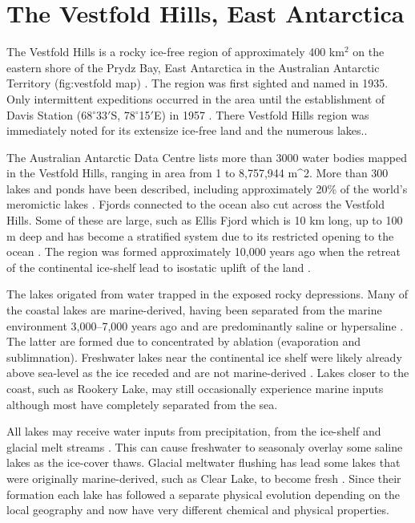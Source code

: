 
\section{The Vestfold Hills, East Antarctica}
The Vestfold Hills is a rocky ice-free region of approximately 400 km$^2$ on the eastern shore of the Prydz Bay, East Antarctica in the Australian Antarctic Territory (fig:vestfold map) \cite{Gibson1999}.
The region was first sighted and named in 1935\cite{Law1959}.
Only intermittent expeditions occurred in the area until the establishment of Davis Station (68$^{\circ}$33$'$S, 78$^{\circ}$15$'$E) in 1957 \cite {Law1959}. 
There Vestfold Hills region was immediately noted for its extensize ice-free land and the numerous lakes.\cite{Johnstone1973}.

The Australian Antarctic Data Centre lists more than 3000 water bodies mapped in the Vestfold Hills, ranging in area from 1 to 8,757,944 m\^{}2.%
More than 300 lakes and ponds have been described, including approximately 20\% of the world's meromictic lakes \cite{Gibson, 1999}. %
Fjords connected to the ocean also cut across the Vestfold Hills. 
Some of these are large, such as Ellis Fjord which is 10 km long, up to 100 m deep and has become a stratified system due to its restricted opening to the ocean \cite{Burke1988}.
The region was formed approximately 10,000 years ago when the retreat of the continental ice-shelf lead to isostatic uplift of the land \cite{Burton1981}. 

The lakes origated from water trapped in the exposed rocky depressions.
Many of the coastal lakes are marine-derived, having been separated from the marine environment 3,000--7,000 years ago \cite{Gibson1999} and are predominantly saline or hypersaline \cite{Burke1988}.
The latter are formed due to concentrated by ablation (evaporation and sublimnation). %
Freshwater lakes near the continental ice shelf were likely already above sea-level as the ice receded and are not marine-derived \cite{Laybourne-Parry1992} \cite{Bronge1996}.
Lakes closer to the coast, such as Rookery Lake, may still occasionally experience marine inputs although most have completely separated from the sea. %

All lakes may receive water inputs from precipitation, from the ice-shelf and glacial melt streams \cite{Burton1981}. 
This can cause freshwater to seasonaly overlay some saline lakes as the ice-cover thaws.
Glacial meltwater flushing has lead some lakes that were originally marine-derived, such as Clear Lake, to become fresh \cite{Pickard1986}\cite{Bird1991}.
Since their formation each lake has followed a separate physical evolution depending on the local geography and now have very different chemical and physical properties. 

